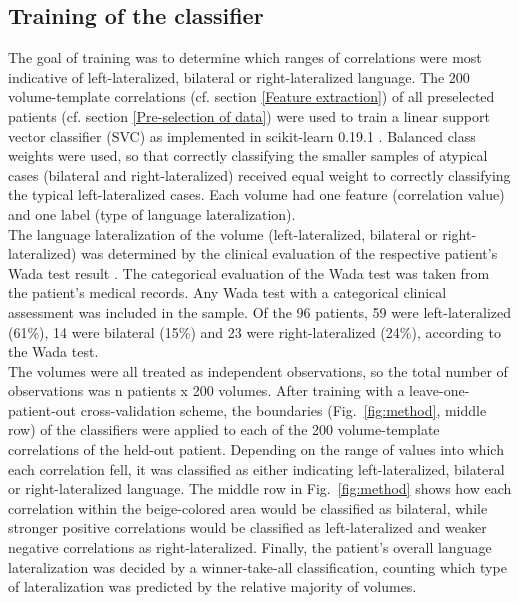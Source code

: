 \documentclass[fleqn,10pt]{SelfArx} %
\begin{document}
\subsection{Training of the classifier} \label{Training of the classifier}
The goal of training was to determine which ranges of correlations were most indicative of left-lateralized, bilateral or right-lateralized language. The 200 volume-template correlations (cf. section \ref{Feature extraction}) of all preselected patients (cf. section \ref{Pre-selection of data}) were used to train a linear support vector classifier (SVC) as implemented in scikit-learn 0.19.1 \citep{Pedregosa_2011}. Balanced class weights were used, so that correctly classifying the smaller samples of atypical cases (bilateral and right-lateralized) received equal weight to correctly classifying the typical left-lateralized cases. Each volume had one feature (correlation value) and one label (type of language lateralization).\\
The language lateralization of the volume (left-lateralized, bilateral or right-lateralized) was determined by the clinical evaluation of the respective patient’s Wada test result \citep{Woermann_2003, Wegrzyn_2019}. The categorical evaluation of the Wada test was taken from the patient’s medical records. Any Wada test with a categorical clinical assessment was included in the sample. Of the 96 patients, 59 were left-lateralized (61\%), 14 were bilateral (15\%) and 23 were right-lateralized (24\%), according to the Wada test.\\
The volumes were all treated as independent observations, so the total number of observations was n patients x 200 volumes. After training with a leave-one-patient-out cross-validation scheme, the boundaries (Fig.~\ref{fig:method}, middle row) of the classifiers were applied to each of the 200 volume-template correlations of the held-out patient. Depending on the range of values into which each correlation fell, it was classified as either indicating left-lateralized, bilateral or right-lateralized language. The middle row in Fig.~\ref{fig:method} shows how each correlation within the beige-colored area would be classified as bilateral, while stronger positive correlations would be classified as left-lateralized and weaker negative correlations as right-lateralized. Finally, the patient’s overall language lateralization was decided by a winner-take-all classification, counting which type of lateralization was predicted by the relative majority of volumes.
\end{document}
